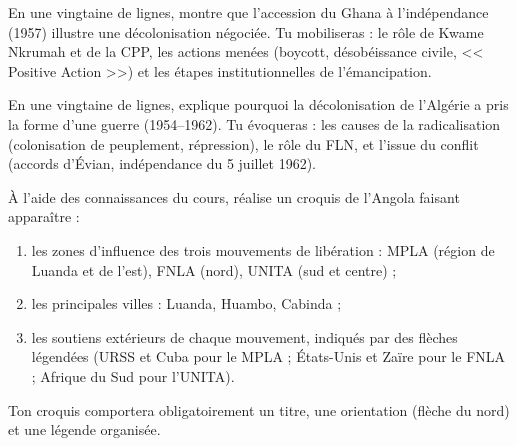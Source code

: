 \documentclass[11pt]{article}
\begin{document}
\begin{exercice}
En une vingtaine de lignes, montre que l'accession du Ghana à l'indépendance (1957) illustre une décolonisation négociée. Tu mobiliseras : le rôle de Kwame Nkrumah et de la CPP, les actions menées (boycott, désobéissance civile, << Positive Action >>) et les étapes institutionnelles de l'émancipation.
\end{exercice}

\begin{exercice}
En une vingtaine de lignes, explique pourquoi la décolonisation de l'Algérie a pris la forme d'une guerre (1954--1962). Tu évoqueras : les causes de la radicalisation (colonisation de peuplement, répression), le rôle du FLN, et l'issue du conflit (accords d'Évian, indépendance du 5 juillet 1962).
\end{exercice}

\begin{exercice}
À l'aide des connaissances du cours, réalise un croquis de l'Angola faisant apparaître :
\begin{enumerate}
\item les zones d'influence des trois mouvements de libération : MPLA (région de Luanda et de l'est), FNLA (nord), UNITA (sud et centre) ;
\item les principales villes : Luanda, Huambo, Cabinda ;
\item les soutiens extérieurs de chaque mouvement, indiqués par des flèches légendées (URSS et Cuba pour le MPLA ; États-Unis et Zaïre pour le FNLA ; Afrique du Sud pour l'UNITA).
\end{enumerate}
Ton croquis comportera obligatoirement un titre, une orientation (flèche du nord) et une légende organisée.
\end{exercice}
\end{document}
